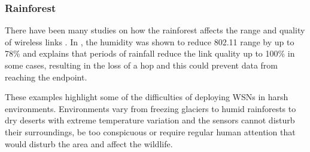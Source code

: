 	\subsubsection{Rainforest}
	There have been many studies on how the rainforest affects the range and quality of wireless links \cite{Figueiredo2009, Wark2008, Rahman2008}. In \cite{Figueiredo2009}, the humidity was shown to reduce 802.11 range by up to 78\% and \cite{Wark2008} explains that periods of rainfall reduce the link quality up to 100\% in some cases, resulting in the loss of a hop and this could prevent data from reaching the endpoint.


These examples highlight some of the difficulties of deploying WSNs in harsh environments. Environments vary from freezing glaciers to humid rainforests to dry deserts with extreme temperature variation and the sensors cannot disturb their surroundings, be too conspicuous or require regular human attention that would disturb the area and affect the wildlife. 





